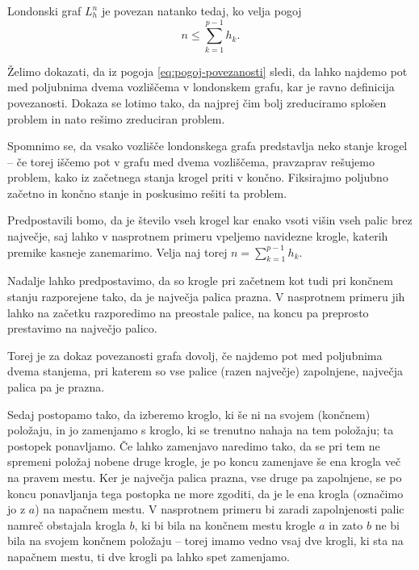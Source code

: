 \documentclass[twoside,11pt]{article}
\begin{document}
\begin{izrek}
    Londonski graf $L_h^n$ je povezan natanko tedaj, ko velja pogoj
    \begin{equation}
    n \leq \sum_{k=1}^{p-1} h_k.
    \label{eq:pogoj-povezanosti}
    \end{equation}
\end{izrek}

\proof
Želimo dokazati, da iz pogoja \eqref{eq:pogoj-povezanosti} sledi, da lahko najdemo pot med poljubnima dvema vozliščema v londonskem grafu, kar je ravno definicija povezanosti. Dokaza se lotimo tako, da najprej čim bolj zreduciramo splošen problem in nato rešimo zreduciran problem.

Spomnimo se, da vsako vozlišče londonskega grafa predstavlja neko stanje krogel -- če torej iščemo pot v grafu med dvema vozliščema, pravzaprav rešujemo problem, kako iz začetnega stanja krogel priti v končno. Fiksirajmo poljubno začetno in končno stanje in poskusimo rešiti ta problem.

Predpostavili bomo, da je število vseh krogel kar enako vsoti višin vseh palic brez največje, saj lahko v nasprotnem primeru vpeljemo navidezne krogle, katerih premike kasneje zanemarimo. Velja naj torej $n = \sum_{k=1}^{p-1}h_k$.

Nadalje lahko predpostavimo, da so krogle pri začetnem kot tudi pri končnem stanju razporejene tako, da je največja palica prazna. V nasprotnem primeru jih lahko na začetku razporedimo na preostale palice, na koncu pa preprosto prestavimo na največjo palico.

Torej je za dokaz povezanosti grafa dovolj, če najdemo pot med poljubnima dvema stanjema, pri katerem so vse palice (razen največje) zapolnjene, največja palica pa je prazna.

Sedaj postopamo tako, da izberemo kroglo, ki še ni na svojem (končnem) položaju, in jo zamenjamo s kroglo, ki se trenutno nahaja na tem položaju; ta postopek ponavljamo. Če lahko zamenjavo naredimo tako, da se pri tem ne spremeni položaj nobene druge krogle, je po koncu zamenjave še ena krogla več na pravem mestu.
Ker je največja palica prazna, vse druge pa zapolnjene, se po koncu ponavljanja tega postopka ne more zgoditi, da je le ena krogla (označimo jo z $a$) na napačnem mestu. V nasprotnem primeru bi zaradi zapolnjenosti palic namreč obstajala krogla $b$, ki bi bila na končnem mestu krogle $a$ in zato $b$ ne bi bila na svojem končnem položaju -- torej imamo vedno vsaj dve krogli, ki sta na napačnem mestu, ti dve krogli pa lahko spet zamenjamo.
\end{document}
